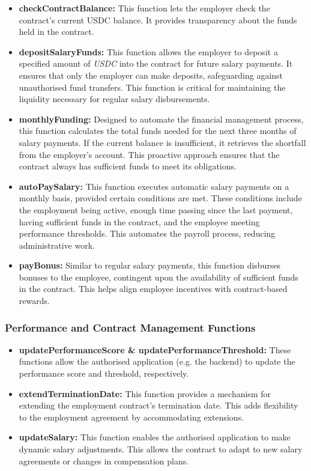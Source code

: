 \begin{itemize}
    \item \textbf{checkContractBalance:} This function lets the employer check the contract's current USDC balance. It provides transparency about the funds held in the contract.
    \item \textbf{depositSalaryFunds:} This function allows the employer to deposit a specified amount of \textit{USDC} into the contract for future salary payments. It ensures that only the employer can make deposits, safeguarding against unauthorised fund transfers. This function is critical for maintaining the liquidity necessary for regular salary disbursements.
    \item \textbf{monthlyFunding:} Designed to automate the financial management process, this function calculates the total funds needed for the next three months of salary payments. If the current balance is insufficient, it retrieves the shortfall from the employer's account. This proactive approach ensures that the contract always has sufficient funds to meet its obligations.
    \item \textbf{autoPaySalary:} This function executes automatic salary payments on a monthly basis, provided certain conditions are met. These conditions include the employment being active, enough time passing since the last payment, having sufficient funds in the contract, and the employee meeting performance thresholds. This automates the payroll process, reducing administrative work.
    \item \textbf{payBonus:} Similar to regular salary payments, this function disburses bonuses to the employee, contingent upon the availability of sufficient funds in the contract. This helps align employee incentives with contract-based rewards.
\end{itemize}

\subsubsection{Performance and Contract Management Functions}

\begin{itemize}
    \item \textbf{updatePerformanceScore \& updatePerformanceThreshold:} These functions allow the authorised application (e.g. the backend) to update the performance score and threshold, respectively. 
    \item \textbf{extendTerminationDate:} This function provides a mechanism for extending the employment contract's termination date. This adds flexibility to the employment agreement by accommodating extensions.
    \item \textbf{updateSalary:} This function enables the authorised application to make dynamic salary adjustments. This allows the contract to adapt to new salary agreements or changes in compensation plans.
\end{itemize}


